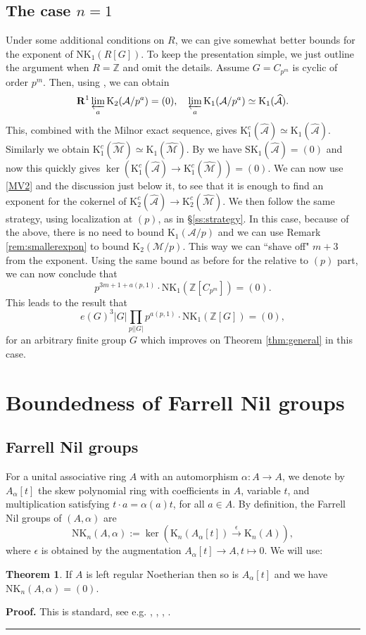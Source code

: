 \documentclass[reqno,11pt,letterpaper]{amsart}
\theoremstyle{plain}
\numberwithin{equation}{subsection}
\newtheorem{theorem}[equation]{Theorem}
\theoremstyle{remark}
\theoremstyle{plain}
\theoremstyle{definition}\newtheorem*{notation}{Notation}
\newcommand{\A}{{\mathcal A}}
\newcommand{\M}{{\mathcal M}}
\newtheorem{theorem}{Theorem}
\newenvironment{proof}[1][Proof]{\noindent\textbf{#1.} }{\ \rule{0.5em}{0.5em}}
\newcommand{\RK}{\mathrm{K}}
\newcommand{\RNK}{\mathrm{NK}}
\newcommand{\BZ}{\mathbb{Z}}
\newcommand{\prolim}{\varprojlim}
\newcommand{\wh}{\widehat}
\newcommand{\rSK}{{\mathrm{SK}}}
\begin{document}
\subsection{The case $n=1$}\label{ss:n1case} Under some additional conditions on $R$, we can give somewhat better bounds for the exponent of $\RNK_1(R[G])$.
To keep the presentation simple, we just outline the argument when $R=\BZ$   and omit the details. Assume $G=C_{p^m}$ is cyclic of order $p^m$. 
Then, using \cite[Theorem 1.2, Theorem 1.3]{CPTII}, we can obtain 
\[
{\bf R}^1\prolim_a \RK_2(\A/p^a)=(0),\quad  \prolim_a \RK_1(\A/p^a)\simeq \RK_1(\wh \A).
\]
This, combined with the Milnor exact sequence, gives $\RK^c_1(\wh \A)\simeq \RK_1(\wh \A)$. Similarly we obtain $\RK^c_1(\wh \M)\simeq \RK_1(\wh \M)$. By 
\cite[Lemma 3.8]{CPTII} we have $\rSK_1(\wh \A)=(0)$ and now this quickly gives $\ker(\RK^c_1(\wh \A)\to \RK^c_1(\wh \M))=(0)$.
 We can now use \eqref{MV2} and the discussion just below it, to see that it is enough to find an exponent for the cokernel of $\RK^c_2(\wh \A)\to \RK^c_2(\wh \M)$. We then follow the same strategy, using localization at $(p)$, as in \S \ref{ss:strategy}. In this case, because of the above,   there is no need to bound $\RK_1(\A/p)$ and we can use Remark \ref{rem:smallerexpon} to bound $\RK_2(\M/p)$. This way we can ``shave off" $m+3$ from the exponent. Using the same bound as before for the relative to $(p)$ part, we can now conclude that
 \[
 p^{3m+1+a(p,1)}\cdot \RNK_1(\BZ[C_{p^m}])=(0).
 \]
This leads to the result that
\[
e(G)^3|G|\prod_{p||G|}  p^{a(p,1)} \cdot \RNK_1(\BZ[G])=(0),
\]
 for an arbitrary finite group $G$ which improves on Theorem \ref{thm:general} in this case. 
 

 
 
  
 \section{Boundedness of Farrell Nil groups}\label{s:AppendixB}
 
 
  
  
 \subsection{Farrell Nil groups} For a unital associative ring $A$ with an automorphism $\alpha: A\to A$, we denote by $A_\alpha[t]$ 
  the skew polynomial ring with coefficients in $A$, variable $t$, and multiplication satisfying $t\cdot a=\alpha(a)t$, for all $a\in A$. 
  By definition, the Farrell Nil groups of $(A,\alpha)$  are
  \[
\RNK_n(A, \alpha):=   \ker(\RK_n(A_\alpha[t])\xrightarrow{\epsilon} \RK_n(A)),
  \]
where $\epsilon$ is obtained by the augmentation $A_\alpha[t]\to A, t\mapsto 0$. We will use:
\begin{theorem}\label{skewhomotopy}
If $A$ is left regular Noetherian then so is $A_\alpha[t]$ and we have $\RNK_n(A, \alpha)=(0)$.
\end{theorem}
\begin{proof} This is standard, see e.g. \cite[Thm. 25]{FaHs}, \cite[Prop. 1.1]{FaJo}, \cite{Grayson}, \cite[Theorem 10.1 and Corollary 10.3]{BaLuck}.\end{proof}
\end{document}
